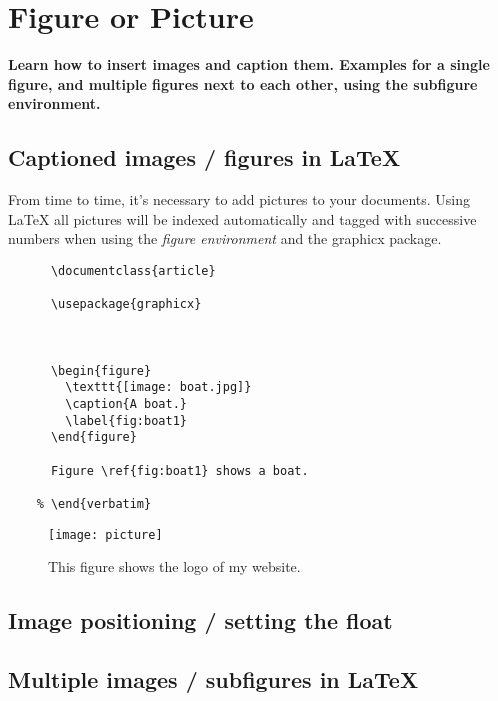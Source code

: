 \maketitle
\newpage

\section{Figure or Picture}
\textbf{Learn how to insert images and caption them. 
  Examples for a single figure, and multiple figures 
  next to each other, using the subfigure environment.}
\subsection{Captioned images / figures in LaTeX}
From time to time, it's necessary to add pictures
 to your documents. Using LaTeX all pictures will 
 be indexed automatically and tagged with successive
  numbers when using the \textit{figure environment}  and the graphicx package.


  \begin{lstlisting}[language={[LaTeX]TeX},caption=figures in \LaTeX{},breaklines=true,frame=single]
    % \begin{verbatim}
      \documentclass{article}
  
      \usepackage{graphicx}
      
      
      
      \begin{figure}
        \texttt{[image: boat.jpg]}
        \caption{A boat.}
        \label{fig:boat1}
      \end{figure}
      
      Figure \ref{fig:boat1} shows a boat.
      
    % \end{verbatim}
    \end{lstlisting}



  \begin{figure}
    \texttt{[image: picture]}
    \caption{This figure shows the logo of my website.}
  \end{figure}  

\subsection{Image positioning / setting the float}
\subsection{Multiple images / subfigures in LaTeX}

